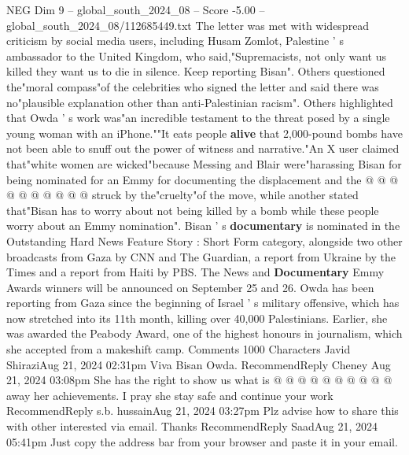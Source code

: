 \begin{textsample}{NEG Dim 9 – global\_south\_2024\_08 – Score -5.00 – global\_south\_2024\_08/112685449.txt}
The letter was met with widespread criticism by social media users, including Husam Zomlot, Palestine ' s ambassador to the United Kingdom, who said,"Supremacists, not only want us killed they want us to die in silence.
Keep reporting Bisan".
Others questioned the"moral compass"of the celebrities who signed the letter and said there was no"plausible explanation other than anti-Palestinian racism".
Others highlighted that Owda ' s work was"an incredible testament to the threat posed by a single young woman with an iPhone.""It eats people \textbf{alive} that 2,000-pound bombs have not been able to snuff out the power of witness and narrative."An X user claimed that"white women are wicked"because Messing and Blair were"harassing Bisan for being nominated for an Emmy for documenting the displacement and the @ @ @ @ @ @ @ @ @ @ struck by the"cruelty"of the move, while another stated that"Bisan has to worry about not being killed by a bomb while these people worry about an Emmy nomination".
Bisan ' s \textbf{documentary} is nominated in the Outstanding Hard News Feature Story : Short Form category, alongside two other broadcasts from Gaza by CNN and The Guardian, a report from Ukraine by the Times and a report from Haiti by PBS.
The News and \textbf{Documentary} Emmy Awards winners will be announced on September 25 and 26.
Owda has been reporting from Gaza since the beginning of Israel ' s military offensive, which has now stretched into its 11th month, killing over 40,000 Palestinians.
Earlier, she was awarded the Peabody Award, one of the highest honours in journalism, which she accepted from a makeshift camp.
Comments 1000 Characters Javid ShiraziAug 21, 2024 02:31pm Viva Bisan Owda.
RecommendReply Cheney Aug 21, 2024 03:08pm She has the right to show us what is @ @ @ @ @ @ @ @ @ @ away her achievements.
I pray she stay safe and continue your work RecommendReply s.b. hussainAug 21, 2024 03:27pm Plz advise how to share this with other interested via email.
Thanks RecommendReply SaadAug 21, 2024 05:41pm Just copy the address bar from your browser and paste it in your email.

\end{textsample}
